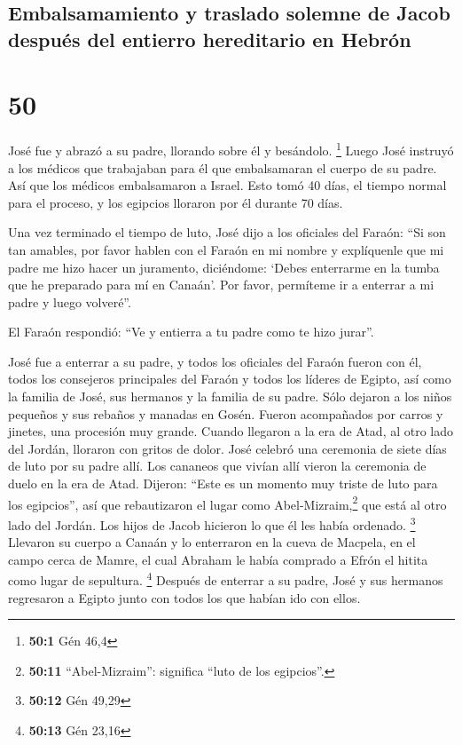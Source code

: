 \hypertarget{embalsamamiento-y-traslado-solemne-de-jacob-despuuxe9s-del-entierro-hereditario-en-hebruxf3n}{%
\subsection{Embalsamamiento y traslado solemne de Jacob después del
entierro hereditario en
Hebrón}\label{embalsamamiento-y-traslado-solemne-de-jacob-despuuxe9s-del-entierro-hereditario-en-hebruxf3n}}

\hypertarget{section-49}{%
\section{50}\label{section-49}}

 José fue y abrazó a su padre, llorando sobre él y
besándolo. \footnote{\textbf{50:1} Gén 46,4}  Luego José
instruyó a los médicos que trabajaban para él que embalsamaran el cuerpo
de su padre. Así que los médicos embalsamaron a Israel. 
Esto tomó 40 días, el tiempo normal para el proceso, y los egipcios
lloraron por él durante 70 días.

 Una vez terminado el tiempo de luto, José dijo a los
oficiales del Faraón: ``Si son tan amables, por favor hablen con el
Faraón en mi nombre y explíquenle que  mi padre me hizo
hacer un juramento, diciéndome: `Debes enterrarme en la tumba que he
preparado para mí en Canaán'. Por favor, permíteme ir a enterrar a mi
padre y luego volveré''.

 El Faraón respondió: ``Ve y entierra a tu padre como te
hizo jurar''.

 José fue a enterrar a su padre, y todos los oficiales del
Faraón fueron con él, todos los consejeros principales del Faraón y
todos los líderes de Egipto,  así como la familia de José,
sus hermanos y la familia de su padre. Sólo dejaron a los niños pequeños
y sus rebaños y manadas en Gosén.  Fueron acompañados por
carros y jinetes, una procesión muy grande.  Cuando
llegaron a la era de Atad, al otro lado del Jordán, lloraron con gritos
de dolor. José celebró una ceremonia de siete días de luto por su padre
allí.  Los cananeos que vivían allí vieron la ceremonia
de duelo en la era de Atad. Dijeron: ``Este es un momento muy triste de
luto para los egipcios'', así que rebautizaron el lugar como
Abel-Mizraim,\footnote{\textbf{50:11} ``Abel-Mizraim'': significa ``luto
  de los egipcios''.} que está al otro lado del Jordán. 
Los hijos de Jacob hicieron lo que él les había ordenado. \footnote{\textbf{50:12}
  Gén 49,29}  Llevaron su cuerpo a Canaán y lo enterraron
en la cueva de Macpela, en el campo cerca de Mamre, el cual Abraham le
había comprado a Efrón el hitita como lugar de sepultura. \footnote{\textbf{50:13}
  Gén 23,16}  Después de enterrar a su padre, José y sus
hermanos regresaron a Egipto junto con todos los que habían ido con
ellos.

